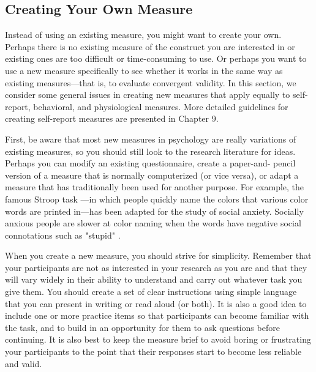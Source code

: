 \subsection{Creating Your Own Measure}

Instead of using an existing measure, you might want to create your own. Perhaps there is no existing measure of the construct you are interested in or existing ones are too difficult or time-consuming to use. Or perhaps you want to use a new measure specifically to see whether it works in the same way as existing measures—that is, to evaluate convergent validity. In this section, we consider some general issues in creating new measures that apply equally to self-report, behavioral, and physiological measures. More detailed guidelines for creating self-report measures are presented in Chapter 9.

First, be aware that most new measures in psychology are really variations of existing measures, so you should still look to the research literature for ideas. Perhaps you can modify an existing questionnaire, create a paper-and- pencil version of a measure that is normally computerized (or vice versa), or adapt a measure that has traditionally been used for another purpose. For example, the famous Stroop task \citep{stroop_studies_1935}---in which people quickly name the colors that various color words are printed in—has been adapted for the study of social anxiety. Socially anxious people are slower at color naming when the words have negative social connotations such as "stupid" \citep{amir_enhanced_2002}.

When you create a new measure, you should strive for simplicity. Remember that your participants are not as interested in your research as you are and that they will vary widely in their ability to understand and carry out whatever task you give them. You should create a set of clear instructions using simple language that you can present in writing or read aloud (or both). It is also a good idea to include one or more practice items so that participants can become familiar with the task, and to build in an opportunity for them to ask questions before continuing. It is also best to keep the measure brief to avoid boring or frustrating your participants to the point that their responses start to become less reliable and valid.

